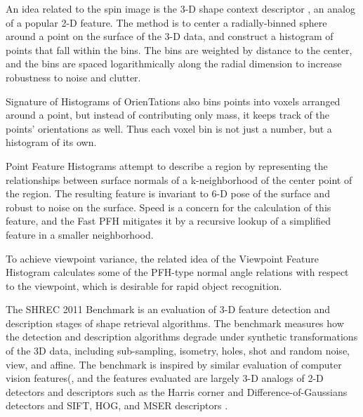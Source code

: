 

An idea related to the spin image is the 3-D shape context descriptor \cite{Frome2004}, an analog of a popular 2-D feature.
The method is to center a radially-binned sphere around a point on the surface of the 3-D data, and construct a histogram of points that fall within the bins.
The bins are weighted by distance to the center, and the bins are spaced logarithmically along the radial dimension to increase robustness to noise and clutter.

Signature of Histograms of OrienTations \cite{shot} also bins points into voxels arranged around a point, but instead of contributing only mass, it keeps track of the points' orientations as well.
Thus each voxel bin is not just a number, but a histogram of its own.

Point Feature Histograms \cite{pfh1} attempt to describe a region by representing the relationships between surface normals of a k-neighborhood of the center point of the region.
The resulting feature is invariant to 6-D pose of the surface and robust to noise on the surface.
Speed is a concern for the calculation of this feature, and the Fast PFH mitigates it by a recursive lookup of a simplified feature in a smaller neighborhood.

To achieve viewpoint variance, the related idea of the Viewpoint Feature Histogram \cite{Rusu2010} calculates some of the PFH-type normal angle relations with respect to the viewpoint, which is desirable for rapid object recognition.



The SHREC 2011 Benchmark \cite{Boyer2011} is an evaluation of 3-D feature detection and description stages of shape retrieval algorithms.
The benchmark measures how the detection and description algorithms degrade under synthetic transformations of the 3D data, including sub-sampling, isometry, holes, shot and random noise, view, and affine.
The benchmark is inspired by similar evaluation of computer vision features(\cite{Mikolajczyk2004,Mikolajczyk2005}, and the features evaluated are largely 3-D analogs of 2-D detectors and descriptors such as the Harris corner and Difference-of-Gaussians \cite{Harris1988,Lowe2004} detectors and SIFT, HOG, and MSER descriptors \cite{Lowe2004,Dalal2005,Matas2004}.


